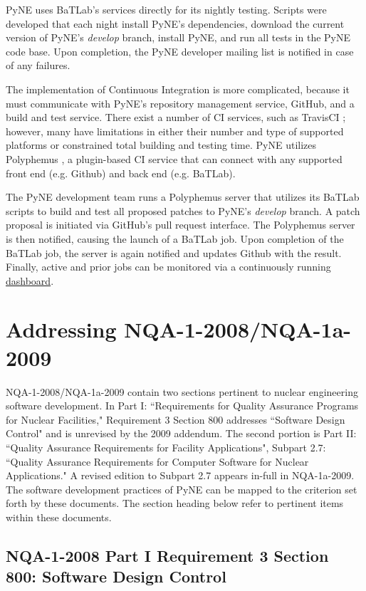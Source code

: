 \documentclass{anstrans}
\begin{document}
PyNE uses BaTLab's services directly for its nightly testing. Scripts were
developed that each night install PyNE's dependencies, download the current version
of PyNE's \textit{develop} branch, install PyNE, and run all tests in the PyNE
code base. Upon completion, the PyNE developer mailing list is notified in case of
any failures.

The implementation of Continuous Integration is more complicated, because it
must communicate with PyNE's repository management service, GitHub, and a build
and test service. There exist a number of CI services, such as TravisCI
\cite{travis_2014}; however, many have limitations in either their number and
type of supported platforms or constrained total building and testing time. PyNE
utilizes Polyphemus \cite{polyphemus_2014}, a plugin-based CI service that can
connect with any supported front end (e.g. Github) and back end (e.g. BaTLab).

The PyNE development team runs a Polyphemus server that utilizes its BaTLab
scripts to build and test all proposed patches to PyNE's \textit{develop}
branch. A patch proposal is initiated via GitHub's pull request
interface. The Polyphemus server is then notified, causing the launch of a
BaTLab job. Upon completion of the BaTLab job, the server is again notified and
updates Github with the result. Finally, active and prior jobs can be monitored
via a continuously running \href{http://gorgus.pyne.io/dashboard}{dashboard}.


\section{Addressing NQA-1-2008/NQA-1a-2009}

NQA-1-2008/NQA-1a-2009 contain two sections pertinent to nuclear engineering
software development. In Part I: ``Requirements for Quality Assurance Programs
for Nuclear Facilities," Requirement 3 Section 800 addresses ``Software Design
Control" and is unrevised by the 2009 addendum. The second portion is Part II:
``Quality Assurance Requirements for Facility Applications", Subpart 2.7:
``Quality Assurance Requirements for Computer Software for Nuclear
Applications." A revised edition to Subpart 2.7 appears in-full in NQA-1a-2009.
The software development practices of PyNE can be mapped to the criterion set
forth by these documents.  The section heading below refer to pertinent items
within these documents.

\subsection{NQA-1-2008 Part I Requirement 3 Section 800: Software Design Control}
\end{document}
